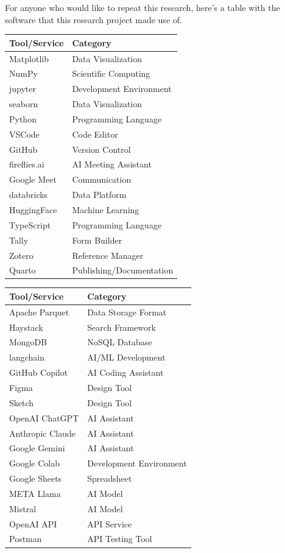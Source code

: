 \documentclass[
  12pt,
  letterpaper,
  DIV=11,
  numbers=noendperiod]{scrartcl}
\begin{document}
For anyone who would like to repeat this research, here's a table with
the software that this research project made use of.

\begin{longtable}[]{@{}ll@{}}
\toprule\noalign{}
Tool/Service & Category \\
\midrule\noalign{}
\endhead
\bottomrule\noalign{}
\endlastfoot
Matplotlib & Data Visualization \\
NumPy & Scientific Computing \\
jupyter & Development Environment \\
seaborn & Data Visualization \\
Python & Programming Language \\
VSCode & Code Editor \\
GitHub & Version Control \\
fireflies.ai & AI Meeting Assistant \\
Google Meet & Communication \\
databricks & Data Platform \\
HuggingFace & Machine Learning \\
TypeScript & Programming Language \\
Tally & Form Builder \\
Zotero & Reference Manager \\
Quarto & Publishing/Documentation \\
\end{longtable}

\begin{longtable}[]{@{}ll@{}}
\toprule\noalign{}
Tool/Service & Category \\
\midrule\noalign{}
\endhead
\bottomrule\noalign{}
\endlastfoot
Apache Parquet & Data Storage Format \\
Haystack & Search Framework \\
MongoDB & NoSQL Database \\
langchain & AI/ML Development \\
GitHub Copilot & AI Coding Assistant \\
Figma & Design Tool \\
Sketch & Design Tool \\
OpenAI ChatGPT & AI Assistant \\
Anthropic Claude & AI Assistant \\
Google Gemini & AI Assistant \\
Google Colab & Development Environment \\
Google Sheets & Spreadsheet \\
META Llama & AI Model \\
Mistral & AI Model \\
OpenAI API & API Service \\
Postman & API Testing Tool \\
\end{longtable}
\end{document}
